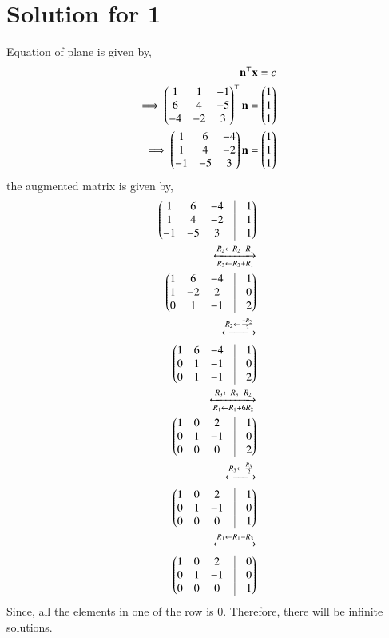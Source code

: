 \documentclass[A4,10pt,twocolumn]{IEEEtran}
\begin{document}
\section{Solution for 1}
Equation of plane is given by,
\begin{align}
\mathbf{n}^\top \mathbf{x} = c\\
\implies \begin{pmatrix}1&1&-1\\6&4&-5\\-4&-2&3\end{pmatrix}^\top \mathbf{n}=\begin{pmatrix}1\\1\\1\end{pmatrix}\\
\implies \begin{pmatrix}1&6&-4\\ 1&4&-2\\ -1&-5&3\end{pmatrix} \mathbf{n} = \begin{pmatrix}1\\1\\1\end{pmatrix}
\end{align}
the augmented matrix is given by,
\begin{align}
\myvec{1&6&-4&\vrule&1\\1&4&-2&\vrule&1\\-1&-5&3&\vrule&1}\\
\xleftrightarrow[R_3 \leftarrow R_3 + R_1]{R_2 \leftarrow R_2 - R_1}\\
\myvec{1&6&-4&\vrule&1\\1&-2&2&\vrule&0\\0&1&-1&\vrule&2}\\
\xleftrightarrow{R_2 \leftarrow \frac{-R_2}{2}} \\ 
\myvec{1&6&-4&\vrule&1\\0&1&-1&\vrule&0\\0&1&-1&\vrule&2}\\
\xleftrightarrow[{R_1 \leftarrow R_1 + 6R_2}] {R_3 \leftarrow R_3 - R_2}\\
\myvec{1&0&2&\vrule&1\\0&1&-1&\vrule&0\\0&0&0&\vrule&2}\\
\xleftrightarrow{R_3\leftarrow \frac{R_3}{2}} \\
\myvec{1&0&2&\vrule&1\\0&1&-1&\vrule&0\\0&0&0&\vrule&1}\\ 
\xleftrightarrow{R_1 \leftarrow R_1 - R_3}\\ 
\myvec{1&0&2&\vrule&0\\0&1&-1&\vrule&0\\0&0&0&\vrule&1} 
\end{align}
Since, all the elements in one of the row is 0. Therefore, there will be infinite solutions.
\end{document}
